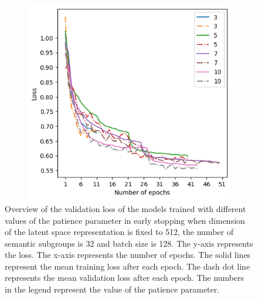 \begin{figure}[H]
  \centering
  \includegraphics[width=350pt,height=250pt]{pictures/loss_early_stopping_patience.png}
  \caption{Overview of the validation loss of the models trained with different values of the patience parameter in early stopping when dimension of the latent space representation is fixed to 512, the number of semantic subgroups is 32 and batch size is 128. The y-axis represents the loss. The x-axis represents the number of epochs. The solid lines represent the mean training loss after each epoch. The dash dot line represents the mean validation loss after each epoch. The numbers in the legend represent the value of the patience parameter. }
  \label{fig:loss_early_stopping_patience}
\end{figure} 

